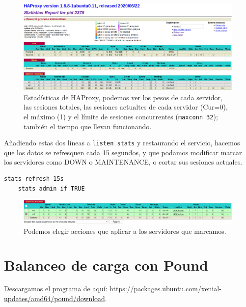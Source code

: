 \documentclass{article}
\begin{document}
\begin{figure}[H]
	\centering
	\includegraphics[width=170mm]{imgs/stats-dashboard}
	\caption{Estadísticas de HAProxy, podemos ver los pesos de cada servidor, las sesiones totales,
		las sesiones actualtes de cada servidor (Cur=0), el máximo (1) y el límite de sesiones
		 concurrentes (\texttt{maxconn 32}); también el tiempo que llevan funcionando.}
	\label{fig:stats-dashboard}
\end{figure}

Añadiendo estas dos líneas a \verb^listen stats^ y restaurando el servicio, hacemos que los datos se refresquen
cada 15 segundos, y que podamos modificar marcar los servidores como DOWN o MAINTENANCE, o cortar sus sesiones
actuales.
\begin{Verbatim}[tabsize=4]
	stats refresh 15s
	stats admin if TRUE
\end{Verbatim}

\begin{figure}[H]
	\centering
	\includegraphics[width=170mm]{imgs/stats-admin}
	\caption{Podemos elegir acciones que aplicar a los servidores que marcamos.}
	\label{fig:stats-admin}
\end{figure}

\section{Balanceo de carga con Pound}

Descargamos el programa de aquí:
\href{https://packages.ubuntu.com/xenial-updates/amd64/pound/download}{https://packages.ubuntu.com/xenial-updates/amd64/pound/download}.
\end{document}
